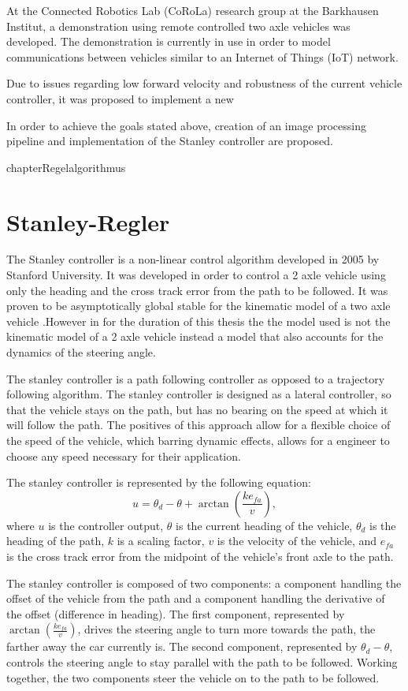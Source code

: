 \documentclass[arbeit=studie,oneside,BCOR=12mm]{ArbeitRST}
\begin{document}
At the Connected Robotics Lab (CoRoLa) research group at the Barkhausen
Institut, a demonstration using remote controlled two axle vehicles was
developed. The demonstration is currently in use in order to model
communications between vehicles similar to an Internet of Things (IoT) network.

Due to issues regarding low forward velocity and robustness of the current vehicle controller,
it was proposed to implement a new 

In order to achieve the goals stated above, creation of an image processing pipeline and implementation of
the Stanley controller are proposed.


chapter{Regelalgorithmus}

\section{Stanley-Regler}
\iffalse
The Stanley controller is a non-linear control algorithm developed in 2005 by
Stanford University. It was developed in order to control a 2 axle vehicle
using only the heading and the cross track error from the path to be followed.
It was proven to be asymptotically global stable for the kinematic model of a
two axle vehicle .However in for the duration of this thesis the the model used
is not the kinematic model of a 2 axle vehicle instead a model that also
accounts for the dynamics of the steering angle.

The stanley controller is a path following controller as opposed to a
trajectory following algorithm. The stanley controller is designed as a lateral
controller,  so that the vehicle stays on the path, but has no bearing on the
speed at which it will follow the path. The positives of this approach allow
for a flexible choice of the speed of the vehicle, which barring dynamic
effects, allows for a engineer to choose any speed necessary for their
application.

The stanley controller is represented by the following equation: $$u = \theta_d
- \theta + \arctan\left(\frac{ke_{fa}}{v}\right),$$ where $u$ is the controller
output, $\theta$ is the current heading of the vehicle, $\theta_d$ is the
heading of the path, $k$ is a scaling factor, $v$ is the velocity of the
vehicle, and $e_{fa}$ is the cross track error from the midpoint of the
vehicle’s front axle to the path. 

The stanley controller is composed of two components:  a component handling the
offset of the vehicle from the path and a component handling the derivative of
the offset (difference in heading).  The first component, represented by
$\arctan(\frac{ke_{fa}}{v})$,  drives the steering angle to turn more towards
the path, the farther away the car currently is. The second component,
represented by $\theta_d - \theta$, controls the steering angle to stay
parallel with the path to be followed. Working together, the two components
steer the vehicle on to the path to be followed.
\end{document}
